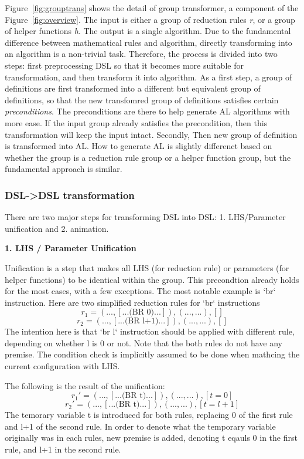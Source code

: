Figure~\ref{fig:grouptrans} shows the detail of group transformer, a component of the Figure~\ref{fig:overview}.
The input is either a group of reduction rules \textit{r}, or a group of helper functions \textit{h}.
The output is a single algorithm.
Due to the fundamental difference between mathematical rules and algorithm,
directly transforming into an algorithm is a non-trivial task.
Therefore, the process is divided into two steps: first preprocessing DSL so that
it becomes more suitable for transformation, and then transform it into algorithm.
As a first step, a group of definitions are first transformed into a different but equivalent group of definitions,
so that the new transfomred group of definitions satisfies certain \textit{preconditions}.
The preconditions are there to help generate AL algorithms with more ease.
If the input group already satisfies the precondition, then this transformation will keep the input intact.
Secondly, Then new group of definition is transformed into AL.
How to generate AL is slightly differenct based on whether the group is a reduction rule group or a helper function
group, but the fundamental approach is similar.

\subsubsection{DSL->DSL transformation}

There are two major steps for transforming DSL into DSL: 1. LHS/Parameter unification and
2. animation.

\textbf{1. LHS / Parameter Unification}

Unification is a step that makes all LHS (for reduction rule) or parameters
(for helper functions) to be identical within the group.
This precondtion already holds for the most cases, with a few exceptions.
The most notable example is `br` instruction.
Here are two simplified reduction rules for `br` instructions
\[
r_1 = (..., [... \text{(BR 0)} ...]),  (..., ...), []
\]
\[
r_2 = (..., [... \text{(BR l+1)} ...]),  (..., ...), []
\]
The intention here is that `br l` instruction should be applied with different rule,
depending on whether l is 0 or not.
Note that the both rules do not have any premise. The condition check is implicitly assumed to be
done when mathcing the current configuration with LHS.

The following is the result of the unification:
\[
r_1' = (..., [... \text{(BR t)} ...]),  (..., ...), [t = 0]
\]
\[
r_2' = (..., [... \text{(BR t)} ...]),  (..., ...), [t = l + 1]
\]
The temorary variable t is introduced for both rules, replacing 0 of the first rule and
l+1 of the second rule. In order to denote what the temporary variable originally was
in each rules, new premise is added, denoting t eqauls 0 in the first rule, and l+1 in the second rule.

